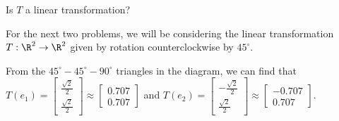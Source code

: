 


Is $T$ a linear transformation?  





\endedxproblem


\endedxvertical











For the next two problems, we will be considering the linear transformation $T: \R^2 \rightarrow \R^2$
given by rotation counterclockwise by $45^\circ$.  


\begin{center}
 

\end{center}


From the $45^\circ-45^\circ-90^\circ$ triangles in the diagram, we can find that  
$T(e_1) = \left[ \begin{array}{c} \frac{\sqrt{2}}{2} \\ \frac{\sqrt{2}}{2}  \end{array} \right] \approx
\left[ \begin{array}{c} 0.707 \\ 0.707 \end{array} \right]$ and
$T(e_2) = \left[ \begin{array}{c} -\frac{\sqrt{2}}{2} \\ \frac{\sqrt{2}}{2}  \end{array} \right] \approx
\left[ \begin{array}{c} -0.707 \\ 0.707  \end{array} \right].$   

